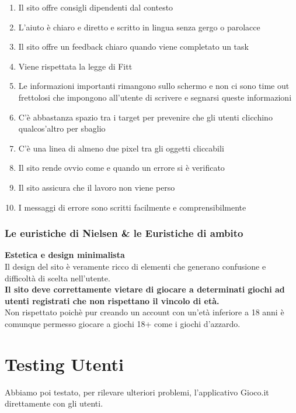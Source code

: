 \documentclass[../Report.tex]{subfiles}
\begin{document}
\begin{enumerate}
        \item Il sito offre consigli dipendenti dal contesto 
        \item L’aiuto è chiaro e diretto e scritto in lingua senza gergo o parolacce
        \item Il sito offre un feedback chiaro quando viene completato un task
        \item Viene rispettata la legge di Fitt
        \item Le informazioni importanti rimangono sullo schermo e non ci sono time out frettolosi che impongono all’utente di scrivere e segnarsi queste informazioni 
        \item C’è abbastanza spazio tra i target per prevenire che gli utenti clicchino qualcos’altro per sbaglio 
        \item C’è una linea di almeno due pixel tra gli oggetti cliccabili 
        \item Il sito rende ovvio come e quando un errore si è verificato 
        \item Il sito assicura che il lavoro non viene perso 
        \item I messaggi di errore sono scritti facilmente e comprensibilmente 
    \end{enumerate}

    \subsubsection{Le euristiche di Nielsen \& le Euristiche di ambito}
        \textbf{Estetica e design minimalista}\\
        Il design del sito è veramente ricco di elementi che generano confusione e difficoltà di scelta nell’utente.\\ 
        \textbf{Il sito deve correttamente vietare di giocare a determinati giochi ad utenti  registrati che non rispettano il vincolo di età.}\\
        Non rispettato poichè pur creando un account con un’età inferiore a 18 anni è comunque permesso giocare a giochi 18+ come i giochi d’azzardo.

    \section{Testing Utenti}
    Abbiamo poi testato, per rilevare ulteriori problemi, l’applicativo Gioco.it direttamente con gli utenti. 
\end{document}
